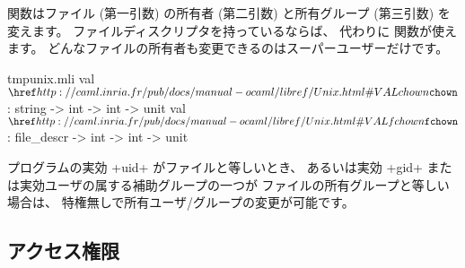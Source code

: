  関数はファイル (第一引数) の所有者 (第二引数) と所有グループ (第三引数) を変えます。
ファイルディスクリプタを持っているならば、 代わりに  関数が使えます。
どんなファイルの所有者も変更できるのはスーパーユーザーだけです。
%
\begin{listingcodefile}{tmpunix.mli}
val $\libvalue{Unix}{chown}$ : string -> int -> int -> unit
val $\libvalue{Unix}{fchown}$ : file_descr -> int -> int -> unit
\end{listingcodefile}

プログラムの実効 \ml+uid+ がファイルと等しいとき、
あるいは実効 \ml+gid+ または実効ユーザの属する補助グループの一つが
ファイルの所有グループと等しい場合は、
特権無しで所有ユーザ/グループの変更が可能です。

\subsection*{アクセス権限}


